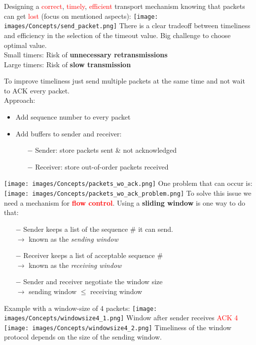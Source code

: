 \documentclass[a4paper, fontsize=8pt, landscape, DIV=1]{scrartcl}
\begin{document}
\begin{multicols*}{4}
    		Designing a \textcolor{Red}{correct}, \textcolor{Red}{timely}, \textcolor{Red}{efficient} transport mechanism knowing that packets can get \textcolor{Red}{lost} (focus on mentioned aspects):
    		\texttt{[image: images/Concepts/send\_packet.png]} 	 
    		There is a clear tradeoff between timeliness and efficiency in the selection of the timeout value. Big challenge to choose optimal value.\\
    		Small timers: Risk of \textbf{unnecessary retransmissions}\\
    		Large timers: Risk of \textbf{slow transmission} \par
    		
    		To improve timeliness just send multiple packets at the same time and not wait to ACK every packet. \\
    		Approach: 
    		\begin{itemize}[noitemsep]
    			\item Add sequence number to every packet
    			\item Add buffers to sender and receiver: 
    			\begin{itemize}
    				\item[$-$] Sender: store packets sent \& not acknowledged
    				\item[$-$] Receiver: store out-of-order packets received
    			\end{itemize}
    		\end{itemize} 
    		\texttt{[image: images/Concepts/packets\_wo\_ack.png]} 	 
    		One problem that can occur is: 
    		\texttt{[image: images/Concepts/packets\_wo\_ack\_problem.png]} 
    		To solve this issue  we need a mechanism for \textcolor{Red}{\textbf{flow control}}.
    		Using a \textbf{sliding window} is one way to do that:
    		\begin{itemize}
    			\item[$-$] Sender keeps a list of the sequence \# it can send.\\
	   			$\rightarrow$ known as the \textit{sending window}
	   			\columnbreak
	   			\item[$-$] Receiver keeps a list of acceptable sequence \#\\
	   			$\rightarrow$ known as the \textit{receiving window }
	   			\item[$-$] Sender and receiver negotiate the window size\\
	   			$\rightarrow$ sending window $\le$ receiving window
    		\end{itemize} 
    		Example with a window-size of 4 packets:
    		\texttt{[image: images/Concepts/windowsize4\_1.png]} 
    		Window after sender receives \textcolor{Red}{ACK 4 }
    		\texttt{[image: images/Concepts/windowsize4\_2.png]} 
    		Timeliness of the window protocol depends on the size of the sending window.\par
    		

\end{multicols*}
\end{document}
